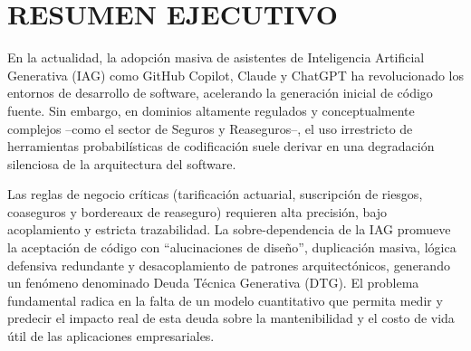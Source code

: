 \chapter*{RESUMEN EJECUTIVO}

En la actualidad, la adopción masiva de asistentes de Inteligencia Artificial
Generativa (IAG) como GitHub Copilot, Claude y ChatGPT ha revolucionado los
entornos de desarrollo de software, acelerando la generación inicial de código
fuente. Sin embargo, en dominios altamente regulados y conceptualmente
complejos --como el sector de Seguros y Reaseguros--, el uso irrestricto de
herramientas probabilísticas de codificación suele derivar en una degradación
silenciosa de la arquitectura del software.

Las reglas de negocio críticas (tarificación actuarial, suscripción de
riesgos, coaseguros y bordereaux de reaseguro) requieren alta precisión, bajo
acoplamiento y estricta trazabilidad. La sobre-dependencia de la IAG promueve
la aceptación de código con ``alucinaciones de diseño'', duplicación masiva,
lógica defensiva redundante y desacoplamiento de patrones arquitectónicos,
generando un fenómeno denominado Deuda Técnica Generativa (DTG). El problema
fundamental radica en la falta de un modelo cuantitativo que permita medir y
predecir el impacto real de esta deuda sobre la mantenibilidad y el costo de
vida útil de las aplicaciones empresariales.

